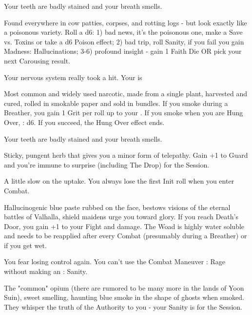 {\begin{multicols}{2}
     Your teeth are badly stained and your breath smells.


  Found everywhere in cow patties, corpses, and rotting logs - but look exactly like a poisonous variety.  Roll a d6: 1) bad news, it's the poisonous one, make a Save vs. Toxins or take a d6 Poison effect; 2) bad trip, roll Sanity, if you fail you gain Madness: Hallucinations; 3-6) profound insight - gain 1 Faith Die OR pick your next Carousing result.

    Your nervous system really took a hit.  Your \MAX \DEX is \DCDOWN



  Most common and widely used narcotic, made from a single plant, harvested and cured, rolled in smokable paper and sold in bundles.  If you smoke during a Breather, you gain 1 Grit per roll up to your \MAX.  If you smoke when you are Hung Over, \RS : d6.  If you succeed, the Hung Over effect ends.

    Your teeth are badly stained and your breath smells.  


  Sticky, pungent herb that gives you a minor form of telepathy.  Gain +1 to Guard \RO  and you're immune to surprise (including The Drop) for the Session.  

    A little slow on the uptake.  You always lose the first Init roll when you enter Combat.



  Hallucinogenic blue paste rubbed on the face, bestows visions of the eternal battles of Valhalla, shield maidens urge you toward glory.  If you reach Death's Door, you gain +1 to your Fight \RO and damage. The Woad is highly water soluble and needs to be reapplied after every Combat (presumably during a Breather) or if you get wet.

    You fear losing control again.  You can't use the Combat Maneuver : Rage without making an \RS : Sanity.


  The "common" opium (there are rumored to be many more in the lands of Yoon Suin), sweet smelling, haunting blue smoke in the shape of ghosts when smoked.  They whisper the truth of the Authority to you - your \MAX Sanity is \DCUP for the Session.


\end{multicols}}

